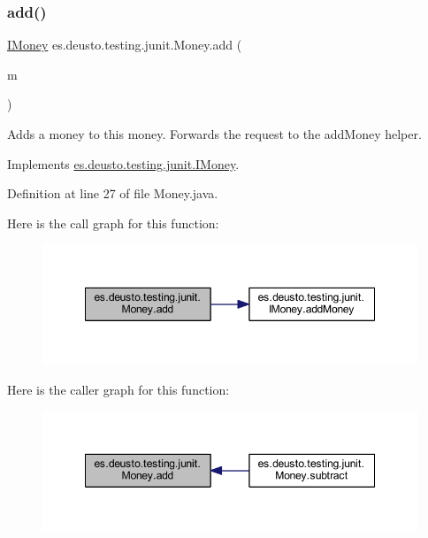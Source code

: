\subsubsection{\texorpdfstring{add()}{add()}}
{\footnotesize\ttfamily \mbox{\hyperlink{interfacees_1_1deusto_1_1testing_1_1junit_1_1_i_money}{I\+Money}} es.\+deusto.\+testing.\+junit.\+Money.\+add (\begin{DoxyParamCaption}\item[{\mbox{\hyperlink{interfacees_1_1deusto_1_1testing_1_1junit_1_1_i_money}{I\+Money}}}]{m }\end{DoxyParamCaption})}

Adds a money to this money. Forwards the request to the add\+Money helper. 

Implements \mbox{\hyperlink{interfacees_1_1deusto_1_1testing_1_1junit_1_1_i_money_a7f3ac1ced239e64294706155c569b8de}{es.\+deusto.\+testing.\+junit.\+I\+Money}}.



Definition at line 27 of file Money.\+java.

Here is the call graph for this function\+:
\nopagebreak
\begin{figure}[H]
\begin{center}
\leavevmode
\includegraphics[width=348pt]{classes_1_1deusto_1_1testing_1_1junit_1_1_money_a6a3d64861c49dee89ffd0ed0c576045d_cgraph}
\end{center}
\end{figure}
Here is the caller graph for this function\+:
\nopagebreak
\begin{figure}[H]
\begin{center}
\leavevmode
\includegraphics[width=348pt]{classes_1_1deusto_1_1testing_1_1junit_1_1_money_a6a3d64861c49dee89ffd0ed0c576045d_icgraph}
\end{center}
\end{figure}
\mbox{\label{classes_1_1deusto_1_1testing_1_1junit_1_1_money_a223a447d5daf23b5e9cc0f551b72e328}} 
